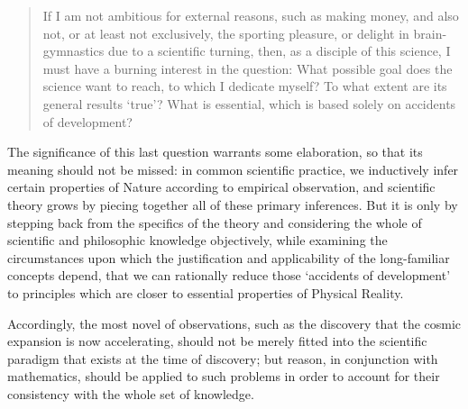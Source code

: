 \begin{quotation}
If I am not ambitious for external reasons, such as making money, and also not, or at least not exclusively, the sporting pleasure, or delight in brain-gymnastics due to a scientific turning, then, as a disciple of this science, I must have a burning interest in the question: What possible goal does the science want to reach, to which I dedicate myself? To what extent are its general results `true'? What is essential, which is based solely on accidents of development?
\end{quotation}

The significance of this last question warrants some elaboration, so that its meaning should not be missed: in common scientific practice, we inductively infer certain properties of Nature according to empirical observation, and scientific theory grows by piecing together all of these primary inferences. But it is only by stepping back from the specifics of the theory and considering the whole of scientific and philosophic knowledge objectively, while examining the circumstances upon which the justification and applicability of the long-familiar concepts depend, that we can rationally reduce those `accidents of development' to principles which are closer to essential properties of Physical Reality. 

Accordingly, the most novel of observations, such as the discovery that the cosmic expansion is now accelerating, should not be merely fitted into the scientific paradigm that exists at the time of discovery; but reason, in conjunction with mathematics, should be applied to such problems in order to account for their consistency with the whole set of knowledge.

